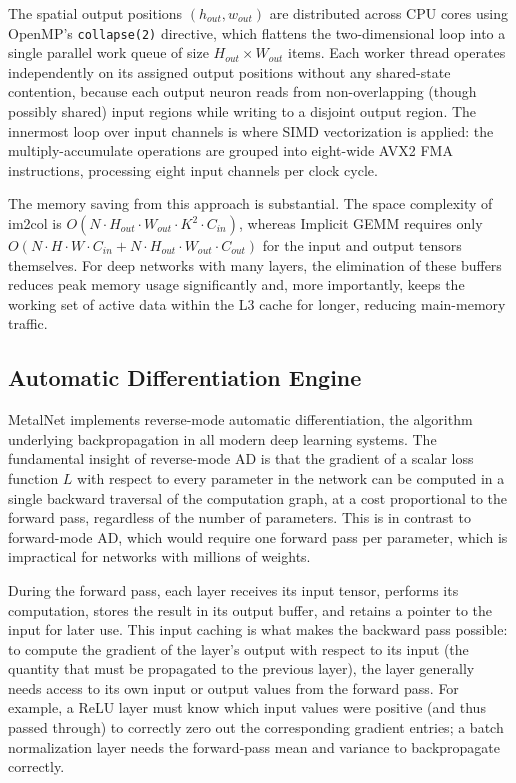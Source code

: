 \documentclass[12pt,oneside,a4paper]{report}
\begin{document}
The spatial output positions $(h_{out}, w_{out})$ are distributed across CPU cores using OpenMP's \texttt{collapse(2)} directive, which flattens the two-dimensional loop into a single parallel work queue of size $H_{out} \times W_{out}$ items. Each worker thread operates independently on its assigned output positions without any shared-state contention, because each output neuron reads from non-overlapping (though possibly shared) input regions while writing to a disjoint output region. The innermost loop over input channels is where SIMD vectorization is applied: the multiply-accumulate operations are grouped into eight-wide AVX2 FMA instructions, processing eight input channels per clock cycle.

The memory saving from this approach is substantial. The space complexity of im2col is $O(N \cdot H_{out} \cdot W_{out} \cdot K^2 \cdot C_{in})$, whereas Implicit GEMM requires only $O(N \cdot H \cdot W \cdot C_{in} + N \cdot H_{out} \cdot W_{out} \cdot C_{out})$ for the input and output tensors themselves. For deep networks with many layers, the elimination of these buffers reduces peak memory usage significantly and, more importantly, keeps the working set of active data within the L3 cache for longer, reducing main-memory traffic.

\subsection{Automatic Differentiation Engine}

MetalNet implements reverse-mode automatic differentiation, the algorithm underlying backpropagation in all modern deep learning systems. The fundamental insight of reverse-mode AD is that the gradient of a scalar loss function $L$ with respect to every parameter in the network can be computed in a single backward traversal of the computation graph, at a cost proportional to the forward pass, regardless of the number of parameters. This is in contrast to forward-mode AD, which would require one forward pass per parameter, which is impractical for networks with millions of weights.

During the forward pass, each layer receives its input tensor, performs its computation, stores the result in its output buffer, and retains a pointer to the input for later use. This input caching is what makes the backward pass possible: to compute the gradient of the layer's output with respect to its input (the quantity that must be propagated to the previous layer), the layer generally needs access to its own input or output values from the forward pass. For example, a ReLU layer must know which input values were positive (and thus passed through) to correctly zero out the corresponding gradient entries; a batch normalization layer needs the forward-pass mean and variance to backpropagate correctly.
\end{document}
